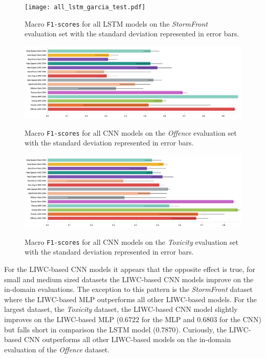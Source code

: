 \begin{figure}
\begin{minipage}{\textwidth}
\centering
  \texttt{[image: all\_lstm\_garcia\_test.pdf]}
  \caption{Macro \texttt{F1-scores} for all LSTM models on the \textit{StormFront} evaluation set with the standard deviation represented in error bars.}
  \label{fig:garcia_lstm_test}
  \vfill
    \includegraphics[width=\textwidth]{all_cnn_davidson_test.pdf}
    \caption{Macro \texttt{F1-scores} for all CNN models on the \textit{Offence} evaluation set with the standard deviation represented in error bars.}
    \label{fig:davidson_cnn_test}
    \vfill
    \includegraphics[width=\textwidth]{all_cnn_wulczyn_test.pdf}
    \caption{Macro \texttt{F1-scores} for all CNN models on the \textit{Toxicity} evaluation set with the standard deviation represented in error bars.}
    \label{fig:wulczyn_cnn_test}
  \end{minipage}
\end{figure}

For the LIWC-based CNN models it appears that the opposite effect is true, for small and medium sized datasets the LIWC-based CNN models improve on the in-domain evaluations.
The exception to this pattern is the \textit{StormFront} dataset where the LIWC-based MLP outperforms all other LIWC-based models.
For the largest dataset, the \textit{Toxicity} dataset, the LIWC-based CNN model slightly improves on the LIWC-based MLP ($0.6722$ for the MLP and $0.6803$ for the CNN) but falls short in comparison the LSTM model ($0.7870$).
Curiously, the LIWC-based CNN outperforms all other LIWC-based models on the in-domain evaluation of the \textit{Offence} dataset.

